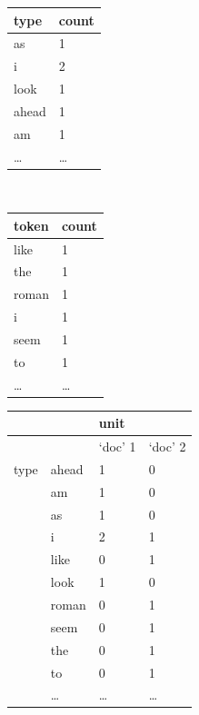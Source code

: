 \documentclass[11pt,compress,professionalfonts]{beamer}
\begin{document}

\begin{center}
\small
\begin{tabular}{ll}\toprule
type & count\\ \midrule
as & 1\\
i & 2\\
look & 1\\
ahead & 1\\
am & 1\\
\ldots & \ldots\\ \bottomrule
\end{tabular}
~~~~~~~~~~
\begin{tabular}{ll}\toprule
token & count\\ \midrule
like & 1\\
the & 1\\
roman & 1\\
i & 1\\
seem & 1\\
to & 1\\
\ldots & \ldots\\ \bottomrule
\end{tabular}
\normalsize
\end{center}


\begin{center}
\small
\begin{tabular}{rlll}\toprule
          &         & unit    & \\ \midrule
          &         & `doc' 1 & `doc' 2 \\ \midrule
type      & ahead   & 1    & 0 \\
          & am      & 1    & 0 \\
          & as      & 1    & 0 \\
          & i       & 2    & 1 \\
          & like    & 0    & 1\\
          & look    & 1    & 0 \\
          & roman   & 0    & 1 \\
          & seem    & 0    & 1 \\          
          & the     & 0    & 1 \\
          & to      & 0    & 1\\
          & \ldots  & \ldots & \ldots \\ \bottomrule
\end{tabular}
\normalsize
\end{center}
\end{document}
